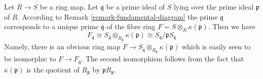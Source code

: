 \begin{remark}
\label{remark-local-ring-fibre}
Let $R \to S$ be a ring map. Let $\mathfrak q$ be a prime
ideal of $S$ lying over the prime ideal $\mathfrak p$ of $R$.
According to Remark \ref{remark-fundamental-diagram}
the prime $\mathfrak q$ corresponds to a unique prime
$\overline{\mathfrak q}$ of the fibre ring
$F = S \otimes_R \kappa(\mathfrak p)$.
Then we have
$$
F_{\overline{\mathfrak q}}
\cong S_\mathfrak q \otimes_{R_\mathfrak p} \kappa(\mathfrak p)
\cong S_\mathfrak q/\mathfrak p S_\mathfrak q
$$
Namely, there is an obvious ring map
$F \to S_\mathfrak q \otimes_{R_\mathfrak p} \kappa(\mathfrak p)$
which is easily seen to be isomorphic to $F \to F_{\overline{\mathfrak q}}$.
The second isomorphism follows from the fact that $\kappa(\mathfrak p)$
is the quotient of $R_\mathfrak p$ by $\mathfrak pR_\mathfrak p$.
\end{remark}